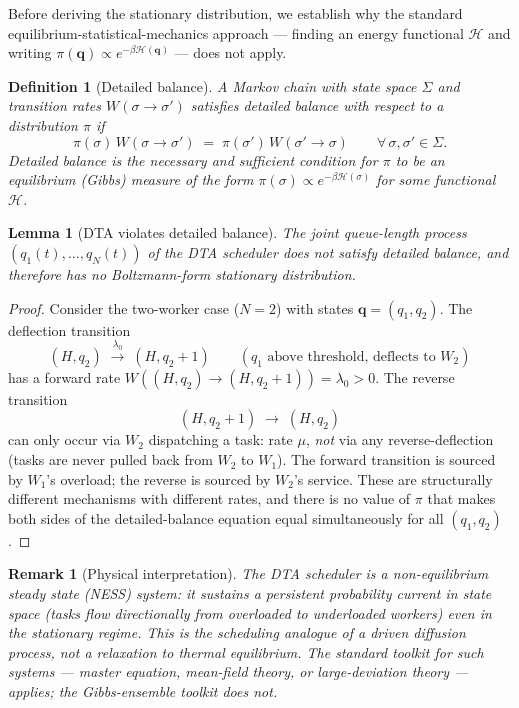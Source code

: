 \documentclass[11pt,a4paper]{report}
\newtheorem{lemma}[theorem]{Lemma}
\newtheorem{definition}{Definition}[section]
\newtheorem{remark}{Remark}[section]
\begin{document}
Before deriving the stationary distribution, we establish why the
standard equilibrium-statistical-mechanics approach --- finding an
energy functional $\mathcal{H}$ and writing $\pi(\bm{q}) \propto
e^{-\beta\mathcal{H}(\bm{q})}$ --- does not apply.

\begin{definition}[Detailed balance]
\label{def:db}
A Markov chain with state space $\Sigma$ and transition rates
$W(\sigma \to \sigma')$ satisfies \emph{detailed balance} with
respect to a distribution $\pi$ if
\[
  \pi(\sigma)\,W(\sigma \to \sigma')
  \;=\;
  \pi(\sigma')\,W(\sigma' \to \sigma)
  \qquad \forall\,\sigma, \sigma' \in \Sigma.
\]
Detailed balance is the necessary and sufficient condition for
$\pi$ to be an equilibrium (Gibbs) measure of the form
$\pi(\sigma) \propto e^{-\beta\mathcal{H}(\sigma)}$ for some
functional $\mathcal{H}$.
\end{definition}

\begin{lemma}[DTA violates detailed balance]
\label{lem:no-db}
The joint queue-length process $(q_1(t), \ldots, q_N(t))$ of
the DTA scheduler does not satisfy detailed balance, and
therefore has no Boltzmann-form stationary distribution.
\end{lemma}

\begin{proof}
Consider the two-worker case ($N=2$) with states
$\bm{q} = (q_1, q_2)$.  The deflection transition
\[
  (H, q_2) \;\xrightarrow{\lambda_0}\; (H, q_2 + 1)
  \qquad (q_1 \text{ above threshold, deflects to } W_2)
\]
has a forward rate $W((H, q_2) \to (H, q_2+1)) = \lambda_0 > 0$.
The reverse transition
\[
  (H, q_2+1) \;\to\; (H, q_2)
\]
can only occur via $W_2$ dispatching a task: rate $\mu$, \emph{not}
via any reverse-deflection (tasks are never pulled back from $W_2$
to $W_1$).  The forward transition is sourced by $W_1$'s overload;
the reverse is sourced by $W_2$'s service.  These are
structurally different mechanisms with different rates, and there
is no value of $\pi$ that makes both sides of the detailed-balance
equation equal simultaneously for all $(q_1, q_2)$.
\end{proof}

\begin{remark}[Physical interpretation]
The DTA scheduler is a \emph{non-equilibrium steady state (NESS)}
system: it sustains a persistent probability current in state space
(tasks flow directionally from overloaded to underloaded workers)
even in the stationary regime.  This is the scheduling analogue of
a driven diffusion process, not a relaxation to thermal equilibrium.
The standard toolkit for such systems --- master equation,
mean-field theory, or large-deviation theory --- applies; the
Gibbs-ensemble toolkit does not.
\end{remark}
\end{document}
